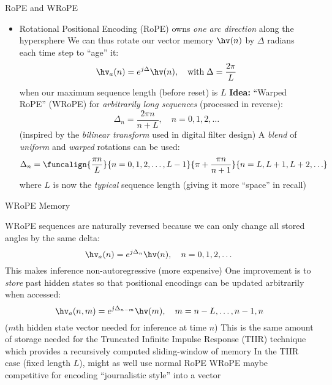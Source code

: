 \begin{slide}[\slideopts,toc={WRoPE}]{RoPE and WRoPE}

\vspace{-1em}

\begin{itemize}
\item Rotational Positional Encoding (RoPE) owns \emph{one arc direction} along the hypersphere %
  \mpitem We can thus rotate our vector memory $\hv(n)$ by $\Delta$ radians each time step to ``age'' it:
  \[
  \hv_a(n) = e^{j\Delta}\hv(n), \quad \mbox{with}\; \Delta = \frac{2\pi}{L}
  \]
  when our maximum sequence length (before reset) is $L$
  \mpitem \textbf{Idea:} ``Warped RoPE'' (WRoPE) for \emph{arbitrarily long sequences} (processed in reverse):
  \[
  \Delta_n = \frac{2\pi n}{n+L}, \quad n=0,1,2,\ldots
  \]
  \maybepause
  (inspired by the \emph{bilinear transform} used in digital filter design)
  \mpitem A \emph{blend} of \emph{uniform} and \emph{warped} rotations can be used:
  \[
  \Delta_n = \funcalign{\frac{\pi n}{L}}{n=0,1,2,\ldots,L-1}{%
    \pi + \frac{\pi n}{n+1}}{n=L,L+1,L+2,\ldots}
  \]
  where $L$ is now the \emph{typical} sequence length (giving it more
  ``space'' in recall)
\end{itemize}
\end{slide}

\begin{slide}[\slideopts]{WRoPE Memory}
  \begin{itemize}
    \mpitem WRoPE sequences are naturally reversed because we can only change all stored angles by the same delta:
    \[
    \hv_a(n) = e^{j\Delta_n}\hv(n), \quad n=0,1,2,\dots
    \]
    \mpitem This makes inference non-autoregressive (more expensive)
    \mpitem One improvement is to \emph{store} past hidden states so that positional encodings can be updated arbitrarily when accessed:
    \[
    \hv_a(n,m) = e^{j\Delta_{n-m}}\hv(m), \quad m=n-L,\dots,n-1,n
    \]
    ($m$th hidden state vector needed for inference at time $n$)
    \mpitem This is the same amount of storage needed for the Truncated Infinite Impulse Response (TIIR) technique
    which provides a recursively computed sliding-window of memory
    \mpitem In the TIIR case (fixed length $L$), might as well use normal RoPE
    \mpitem WRoPE maybe competitive for encoding ``journalistic style'' into a vector
  \end{itemize}
\end{slide}

